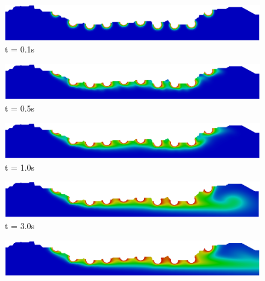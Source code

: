 \begin{figure}[H]
     \begin{minipage}{.50\linewidth}
      \centering
      \includegraphics[scale=0.18]{./02_chaps/cap_solution/figure/conc1_RealStrut1.png}\\
      t = 0.1s
     \end{minipage}%
     \begin{minipage}{.50\linewidth}
      \centering
      \includegraphics[scale=0.18]{./02_chaps/cap_solution/figure/conc1_RealStrut2.png}\\
      t = 0.5s
     \end{minipage}
     \begin{minipage}{.50\linewidth}
     \medskip
      \centering
      \includegraphics[scale=0.18]{./02_chaps/cap_solution/figure/conc1_RealStrut3.png}\\
      t = 1.0s
     \end{minipage}%
     \begin{minipage}{.50\linewidth}
     \medskip
      \centering
      \includegraphics[scale=0.18]{./02_chaps/cap_solution/figure/conc1_RealStrut4.png}\\
      t = 3.0s
     \end{minipage}
     \begin{minipage}{.50\linewidth}
      \centering
      \includegraphics[scale=0.18]{./02_chaps/cap_solution/figure/conc1_RealStrut5.png}\\

\end{minipage}
\end{figure}
